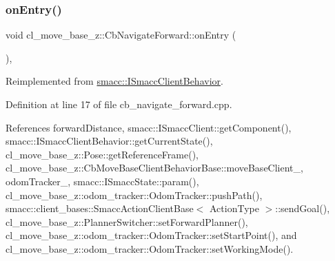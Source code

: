 \subsubsection{\texorpdfstring{on\+Entry()}{onEntry()}}
{\footnotesize\ttfamily void cl\+\_\+move\+\_\+base\+\_\+z\+::\+Cb\+Navigate\+Forward\+::on\+Entry (\begin{DoxyParamCaption}{ }\end{DoxyParamCaption})\hspace{0.3cm}{\ttfamily [override]}, {\ttfamily [virtual]}}



Reimplemented from \hyperlink{classsmacc_1_1ISmaccClientBehavior_a3ec24a839087c550e1d62a81e48cf530}{smacc\+::\+I\+Smacc\+Client\+Behavior}.



Definition at line 17 of file cb\+\_\+navigate\+\_\+forward.\+cpp.



References forward\+Distance, smacc\+::\+I\+Smacc\+Client\+::get\+Component(), smacc\+::\+I\+Smacc\+Client\+Behavior\+::get\+Current\+State(), cl\+\_\+move\+\_\+base\+\_\+z\+::\+Pose\+::get\+Reference\+Frame(), cl\+\_\+move\+\_\+base\+\_\+z\+::\+Cb\+Move\+Base\+Client\+Behavior\+Base\+::move\+Base\+Client\+\_\+, odom\+Tracker\+\_\+, smacc\+::\+I\+Smacc\+State\+::param(), cl\+\_\+move\+\_\+base\+\_\+z\+::odom\+\_\+tracker\+::\+Odom\+Tracker\+::push\+Path(), smacc\+::client\+\_\+bases\+::\+Smacc\+Action\+Client\+Base$<$ Action\+Type $>$\+::send\+Goal(), cl\+\_\+move\+\_\+base\+\_\+z\+::\+Planner\+Switcher\+::set\+Forward\+Planner(), cl\+\_\+move\+\_\+base\+\_\+z\+::odom\+\_\+tracker\+::\+Odom\+Tracker\+::set\+Start\+Point(), and cl\+\_\+move\+\_\+base\+\_\+z\+::odom\+\_\+tracker\+::\+Odom\+Tracker\+::set\+Working\+Mode().



